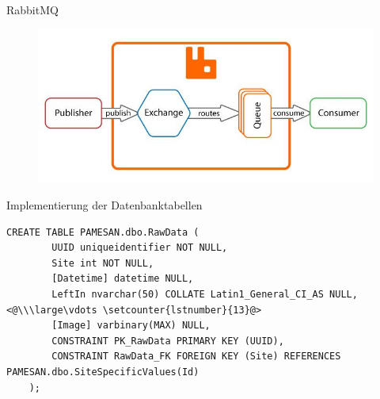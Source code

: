 \documentclass[10pt,ngerman]{beamer}
\begin{document}
\begin{frame}[fragile]{RabbitMQ}
  {\begin{figure}[htpb]
      \centering
      \includegraphics[width=1\textwidth]{pics/rabbitmq-broker.jpg}
    \end{figure}}
\end{frame}


\begin{frame}[fragile]{Implementierung der Datenbanktabellen}
  \begin{lstlisting}[style=sql-style,
    breaklines=true]
    CREATE TABLE PAMESAN.dbo.RawData (
        UUID uniqueidentifier NOT NULL,
        Site int NOT NULL,
        [Datetime] datetime NULL,
        LeftIn nvarchar(50) COLLATE Latin1_General_CI_AS NULL, <@\\\large\vdots \setcounter{lstnumber}{13}@>
        [Image] varbinary(MAX) NULL,
        CONSTRAINT PK_RawData PRIMARY KEY (UUID),
        CONSTRAINT RawData_FK FOREIGN KEY (Site) REFERENCES PAMESAN.dbo.SiteSpecificValues(Id)
    );
\end{lstlisting}
\end{frame}
\end{document}

